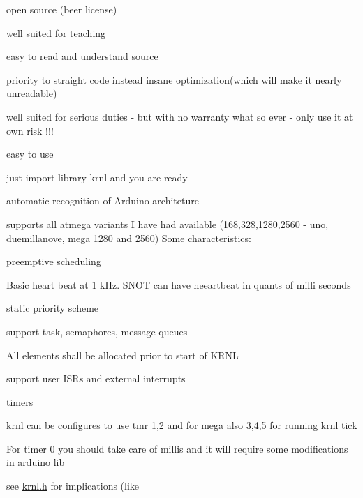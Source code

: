 \begin{DoxyItemize}
\item open source (beer license)
\item well suited for teaching
\begin{DoxyItemize}
\item easy to read and understand source
\item priority to straight code instead insane optimization(which will make it nearly unreadable)
\end{DoxyItemize}
\item well suited for serious duties -\/ but with no warranty what so ever -\/ only use it at own risk !!!
\item easy to use
\begin{DoxyItemize}
\item just import library krnl and you are ready
\end{DoxyItemize}
\item automatic recognition of Arduino architeture
\begin{DoxyItemize}
\item supports all atmega variants I have had available (168,328,1280,2560 -\/ uno, duemillanove, mega 1280 and 2560) Some characteristics\+:
\end{DoxyItemize}
\item preemptive scheduling
\begin{DoxyItemize}
\item Basic heart beat at 1 k\+Hz. S\+N\+O\+T can have heeartbeat in quants of milli seconds
\item static priority scheme
\end{DoxyItemize}
\item support task, semaphores, message queues
\begin{DoxyItemize}
\item All elements shall be allocated prior to start of K\+R\+N\+L
\end{DoxyItemize}
\item support user I\+S\+Rs and external interrupts
\item timers
\begin{DoxyItemize}
\item krnl can be configures to use tmr 1,2 and for mega also 3,4,5 for running krnl tick
\item For timer 0 you should take care of millis and it will require some modifications in arduino lib
\item see \hyperlink{krnl_8h}{krnl.\+h} for implications (like

\end{DoxyItemize}
\end{DoxyItemize}
